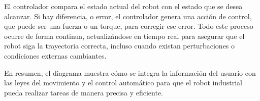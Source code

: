El controlador compara el estado actual del robot con el estado que se desea alcanzar. Si hay diferencia, o error, el controlador genera una acción de control, que puede ser una fuerza o un torque, para corregir ese error. Todo este proceso ocurre de forma continua, actualizándose en tiempo real para asegurar que el robot siga la trayectoria correcta, incluso cuando existan perturbaciones o condiciones externas cambiantes.

En resumen, el diagrama muestra cómo se integra la información del usuario con las leyes del movimiento y el control automático para que el robot industrial pueda realizar tareas de manera precisa y eficiente.
\cite{fundamentosRobotica}
\cite{introduccionRobotica}



